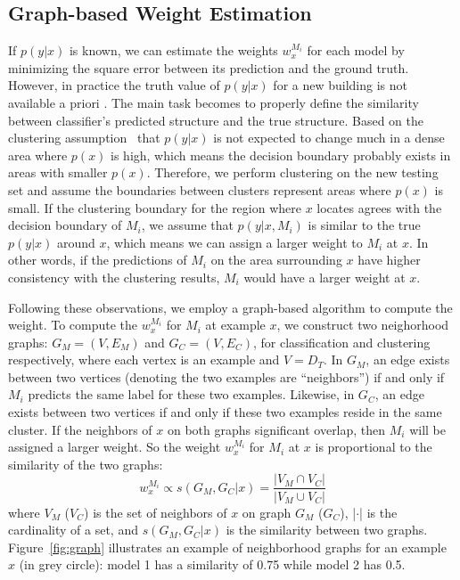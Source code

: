 \subsection{Graph-based Weight Estimation}\label{sec:gwe}
If $p(y|x)$ is known, we can estimate the weights $w_{x}^{M_i}$ for each model by minimizing the square error between its prediction and the ground truth. 
However, in practice the truth value of $p(y|x)$ for a new building is not available a priori . 
The main task becomes to properly define the similarity between classifier's predicted structure and the true structure. 
Based on the clustering assumption~\cite{cluster} that $p(y|x)$ is not expected
to change much in a dense area where $p(x)$ is high, which means the decision boundary probably exists in areas with smaller $p(x)$.
Therefore, we perform clustering on the new testing set and assume the boundaries between clusters represent areas where $p(x)$ is small.
If the clustering boundary for the region where $x$ locates agrees with the decision boundary of $M_i$, we assume that $p(y|x,M_i)$ is similar to the true $p(y|x)$ around $x$, which means we can assign a larger weight to $M_i$ at $x$. 
In other words, if the predictions of $M_i$ on the area surrounding $x$ have higher consistency with the clustering results, $M_i$ would have a larger weight at $x$. 

Following these observations, we employ a graph-based algorithm to compute the weight.
To compute the $w_{x}^{M_i}$ for $M_i$ at example $x$, we construct two neighorhood graphs: 
$G_M = (V, E_M)$ and $G_C = (V, E_C)$, for classification and clustering respectively, 
where each vertex is an example and $V = D_T$. In $G_M$, an edge exists between two vertices (denoting the two examples are ``neighbors'') if and only if $M_i$ predicts the same label for these two examples. Likewise, in $G_C$, an edge exists between two vertices if and only if these two examples reside in the same cluster.
If the neighbors of $x$ on both graphs significant overlap, then $M_i$ will be assigned a larger weight.
So the weight $w_{x}^{M_i}$ for $M_i$ at $x$ is proportional to the similarity of the two graphs:
\begin{equation}\label{eq_sim}
w_{x}^{M_i} \propto s(G_M, G_C|x) = \frac {|V_M \cap V_C|} {|V_M \cup V_C|}
\end{equation}
where $V_M$ ($V_C$) is the set of neighbors of $x$ on graph $G_M$ ($G_C$), |$\cdot$| is the cardinality of a set, and $s(G_M, G_C|x)$ is the similarity between two graphs. 
Figure~\ref{fig:graph} illustrates an example of neighborhood graphs for an example $x$ (in grey circle): model 1 has a similarity of 0.75 while model 2 has 0.5.

